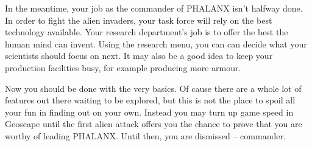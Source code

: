 In the meantime, your job as the commander of PHALANX isn't halfway done. In order to fight the alien invaders, your task force will rely on the best technology available. Your research department's job is to offer the best the human mind can invent. Using the research menu, you can can decide what your scientists should focus on next. It may also be a good idea to keep your production facilities busy, for example producing more armour.

Now you should be done with the very basics. Of cause there are a whole lot of features out there waiting to be explored, but this is not the place to spoil all your fun in finding out on your own. Instead you may turn up game speed in Geoscape until the first alien attack offers you the chance to prove that you are worthy of leading PHALANX. Until then, you are dismissed -- commander.

